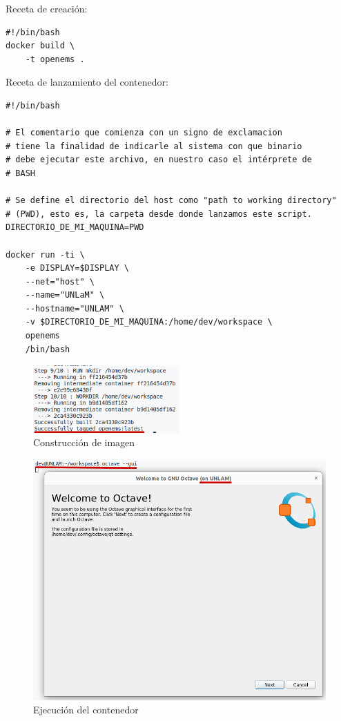 \documentclass[
    11pt,
    spanish,
    a4paper
]{article}
\begin{document}
Receta de creación:

\begin{verbatim}
#!/bin/bash
docker build \
    -t openems .
\end{verbatim}

Receta de lanzamiento del contenedor:

\begin{verbatim}
#!/bin/bash

# El comentario que comienza con un signo de exclamacion
# tiene la finalidad de indicarle al sistema con que binario
# debe ejecutar este archivo, en nuestro caso el intérprete de
# BASH

# Se define el directorio del host como "path to working directory"
# (PWD), esto es, la carpeta desde donde lanzamos este script.
DIRECTORIO_DE_MI_MAQUINA=PWD

docker run -ti \
    -e DISPLAY=$DISPLAY \
    --net="host" \
    --name="UNLaM" \
    --hostname="UNLAM" \
    -v $DIRECTORIO_DE_MI_MAQUINA:/home/dev/workspace \
    openems
    /bin/bash
\end{verbatim}

\begin{figure}[htbp]
	\centering
	\includegraphics[width=0.5\textwidth]{./img/docker-build.png}
	\caption{Construcción de imagen}
	\label{fig:dockerbuild}
\end{figure}

\begin{figure}[htbp]
	\centering
	\includegraphics[width=\textwidth]{./img/docker-run.png}
	\caption{Ejecución del contenedor}
	\label{fig:dockerrun}
\end{figure}
\end{document}
